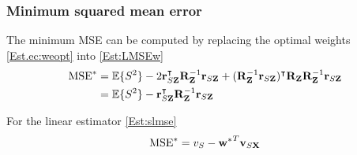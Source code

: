 \subsubsection{Minimum squared mean error}
 

{The minimum MSE can be computed by replacing the optimal weights \eqref{Est.ec:weopt} into
\eqref{Est:LMSEw}
\begin{align}
\label{Est:LMSEw2}
\text{MSE}^* &= \mathbb{E}\{S^2\} 
     - 2 {\bf r}_{S{\bf Z}}^\intercal {{\bf R}_{\bf Z}^{-1}} {\bf r}_{S{\bf Z}}  
     + ({{\bf R}_{\bf Z}^{-1}} {\bf r}_{S{\bf Z}} )^\intercal {\bf R}_{\bf Z} 
       {{\bf R}_{\bf Z}^{-1}} {\bf r}_{S{\bf Z}}    \nonumber\\
    &= \mathbb{E}\{S^2\} 
     - {\bf r}_{S{\bf Z}}^\intercal {{\bf R}_{\bf Z}^{-1}} {\bf r}_{S{\bf Z}}  
\end{align}}

For the linear estimator \eqref{Est:slmse}
\begin{align}
\text{MSE}^* = v_S - {{\bf w}^*}^T {\bf v}_{S{\bf X}} 
\end{align}

